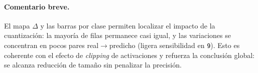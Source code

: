 \FloatBarrier

\paragraph{Comentario breve.}
El mapa $\Delta$ y las barras por clase permiten localizar el impacto de la cuantización: la mayoría de filas permanece casi igual, y las variaciones se concentran en pocos pares real$\rightarrow$predicho (ligera sensibilidad en \texttt{9}). Esto es coherente con el efecto de \emph{clipping} de activaciones y refuerza la conclusión global: se alcanza reducción de tamaño sin penalizar la precisión.
